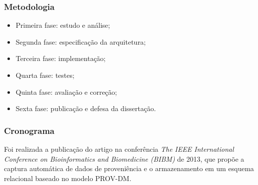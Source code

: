 \documentclass{beamer}
\begin{document}
\begin{frame}
\frametitle{Metodologia}
\begin{itemize}
\item Primeira fase: estudo e an\'alise;
\item Segunda fase: especifica\c{c}\~ao da arquitetura;
\item Terceira fase: implementa\c{c}\~ao;
\item Quarta fase: testes;
\item Quinta fase: avalia\c{c}\~ao e corre\c{c}\~ao;
\item Sexta fase: publica\c{c}\~ao e defesa da disserta\c{c}\~ao.
\end{itemize}
\end{frame}


\begin{frame}
\frametitle{Cronograma}
\begin{block}{}
Foi realizada a publica\c{c}\~ao do artigo \cite{p18} na confer\^encia
\textit{The IEEE International Conference on Bioinformatics and Biomedicine (BIBM)} de 2013, que prop\~oe a
  captura autom\'atica de dados de proveni\^encia e o armazenamento em
  um esquema relacional baseado no modelo PROV-DM.
\end{block}
\begin{table}[!h]
  \centering
  \large
  \setlength{\arrayrulewidth}{2\arrayrulewidth}
  \setlength{\belowcaptionskip}{3pt}
  \caption{\ Cronograma de atividades.}
\label{tab:cronograma}
\end{table}
\end{frame}
\end{document}
